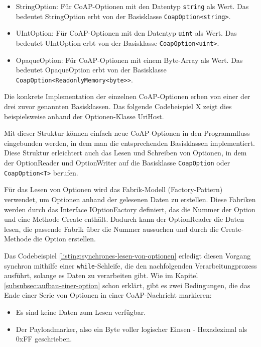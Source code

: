 \begin{itemize}
    \item StringOption: Für CoAP-Optionen mit den Datentyp \texttt{string} als Wert. Das bedeutet StringOption erbt von der Basisklasse \texttt{CoapOption<string>}.
    \item UIntOption: Für CoAP-Optionen mit den Datentyp \texttt{uint} als Wert. Das bedeutet UIntOption erbt von der Basisklasse \texttt{CoapOption<uint>}.
    \item OpaqueOption: Für CoAP-Optionen mit einem Byte-Array als Wert. Das bedeutet OpaqueOption erbt von der Basisklasse \texttt{CoapOption<ReadonlyMemory<byte>>}.
\end{itemize}

Die konkrete Implementation der einzelnen CoAP-Optionen erben von einer der drei zuvor genannten Basisklassen. Das folgende Codebeispiel X zeigt dies beispielsweise anhand der Optionen-Klasse UriHost.

Mit dieser Struktur können einfach neue CoAP-Optionen in den Programmfluss eingebunden werden, in dem man die entsprechenden Basisklassen implementiert. Diese Struktur erleichtert auch das Lesen und Schreiben von Optionen, in dem der OptionReader und OptionWriter auf die Basisklasse \texttt{CoapOption} oder \texttt{CoapOption<T>} berufen.

Für das Lesen von Optionen wird das Fabrik-Modell (Factory-Pattern) verwendet, um Optionen anhand der gelesenen Daten zu erstellen. Diese Fabriken werden durch das Interface IOptionFactory definiert, das die Nummer der Option und eine Methode Create enthält. Dadurch kann der OptionReader die Daten lesen, die passende Fabrik über die Nummer aussuchen und durch die Create-Methode die Option erstellen.

Das Codebeispiel \ref{listing:synchrones-lesen-von-optionen} erledigt diesen Vorgang synchron mithilfe einer \texttt{while}-Schleife, die den nachfolgenden Verarbeitungprozess ausführt, solange es Daten zu verarbeiten gibt. Wie im Kapitel \ref{subsubsec:aufbau-einer-option} schon erklärt, gibt es zwei Bedingungen, die das Ende einer Serie von Optionen in einer CoAP-Nachricht markieren:
\begin{itemize}
    \item Es sind keine Daten zum Lesen verfügbar.
    \item Der Payloadmarker, also ein Byte voller logischer Einsen - Hexadezimal als 0xFF geschrieben.
\end{itemize}


